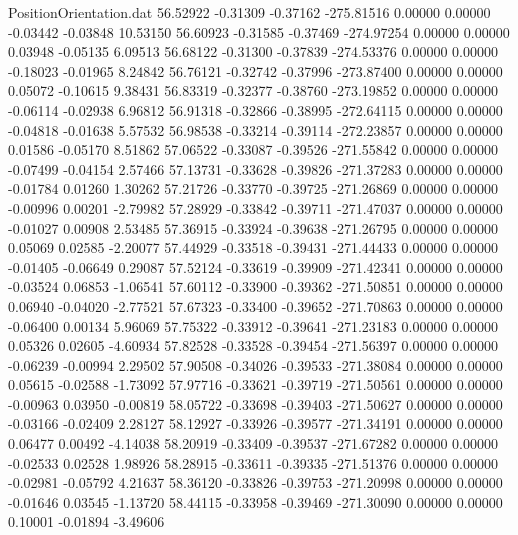 \begin{filecontents}{PositionOrientation.dat}
  56.52922   -0.31309   -0.37162  -275.81516    0.00000    0.00000   -0.03442   -0.03848   10.53150
  56.60923   -0.31585   -0.37469  -274.97254    0.00000    0.00000    0.03948   -0.05135    6.09513
  56.68122   -0.31300   -0.37839  -274.53376    0.00000    0.00000   -0.18023   -0.01965    8.24842
  56.76121   -0.32742   -0.37996  -273.87400    0.00000    0.00000    0.05072   -0.10615    9.38431
  56.83319   -0.32377   -0.38760  -273.19852    0.00000    0.00000   -0.06114   -0.02938    6.96812
  56.91318   -0.32866   -0.38995  -272.64115    0.00000    0.00000   -0.04818   -0.01638    5.57532
  56.98538   -0.33214   -0.39114  -272.23857    0.00000    0.00000    0.01586   -0.05170    8.51862
  57.06522   -0.33087   -0.39526  -271.55842    0.00000    0.00000   -0.07499   -0.04154    2.57466
  57.13731   -0.33628   -0.39826  -271.37283    0.00000    0.00000   -0.01784    0.01260    1.30262
  57.21726   -0.33770   -0.39725  -271.26869    0.00000    0.00000   -0.00996    0.00201   -2.79982
  57.28929   -0.33842   -0.39711  -271.47037    0.00000    0.00000   -0.01027    0.00908    2.53485
  57.36915   -0.33924   -0.39638  -271.26795    0.00000    0.00000    0.05069    0.02585   -2.20077
  57.44929   -0.33518   -0.39431  -271.44433    0.00000    0.00000   -0.01405   -0.06649    0.29087
  57.52124   -0.33619   -0.39909  -271.42341    0.00000    0.00000   -0.03524    0.06853   -1.06541
  57.60112   -0.33900   -0.39362  -271.50851    0.00000    0.00000    0.06940   -0.04020   -2.77521
  57.67323   -0.33400   -0.39652  -271.70863    0.00000    0.00000   -0.06400    0.00134    5.96069
  57.75322   -0.33912   -0.39641  -271.23183    0.00000    0.00000    0.05326    0.02605   -4.60934
  57.82528   -0.33528   -0.39454  -271.56397    0.00000    0.00000   -0.06239   -0.00994    2.29502
  57.90508   -0.34026   -0.39533  -271.38084    0.00000    0.00000    0.05615   -0.02588   -1.73092
  57.97716   -0.33621   -0.39719  -271.50561    0.00000    0.00000   -0.00963    0.03950   -0.00819
  58.05722   -0.33698   -0.39403  -271.50627    0.00000    0.00000   -0.03166   -0.02409    2.28127
  58.12927   -0.33926   -0.39577  -271.34191    0.00000    0.00000    0.06477    0.00492   -4.14038
  58.20919   -0.33409   -0.39537  -271.67282    0.00000    0.00000   -0.02533    0.02528    1.98926
  58.28915   -0.33611   -0.39335  -271.51376    0.00000    0.00000   -0.02981   -0.05792    4.21637
  58.36120   -0.33826   -0.39753  -271.20998    0.00000    0.00000   -0.01646    0.03545   -1.13720
  58.44115   -0.33958   -0.39469  -271.30090    0.00000    0.00000    0.10001   -0.01894   -3.49606

\end{filecontents}
